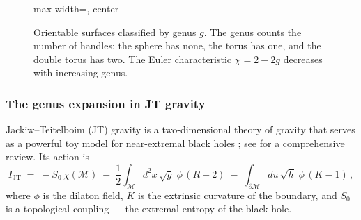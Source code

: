 \documentclass[11pt,letterpaper]{article}
\theoremstyle{plain}
\theoremstyle{definition}
\theoremstyle{remark}
\begin{document}
\begin{figure}[t]
\centering
\begin{adjustbox}{max width=\textwidth, center}
\end{adjustbox}
\caption{Orientable surfaces classified by genus $g$.  The genus counts the
number of handles: the sphere has none, the torus has one, and the double torus
has two.  The Euler characteristic $\chi = 2 - 2g$ decreases with increasing
genus.}\label{fig05:genus_surfaces}
\end{figure}

\subsubsection*{The genus expansion in JT gravity}

Jackiw--Teitelboim (JT) gravity \citep{jackiw1985, teitelboim1983} is a
two-dimensional theory of gravity that serves as a powerful toy model
for near-extremal black holes \citep{maldacena2016}; see
\citet{mertensturiaci2023} for a comprehensive review.  Its action is
\begin{equation}\label{eq05:jt_action}
  I_{\mathrm{JT}} \;=\; -S_0\,\chi(\mathcal{M})
  \;-\; \frac{1}{2}\int_{\mathcal{M}} d^2x\,\sqrt{g}\;\phi\,(R+2)
  \;-\; \int_{\partial\mathcal{M}} du\,\sqrt{h}\;\phi\,(K-1)\,,
\end{equation}
where $\phi$ is the dilaton field, $K$ is the extrinsic curvature of the
boundary, and $S_0$ is a topological coupling --- the extremal entropy of the
black hole.
\end{document}
